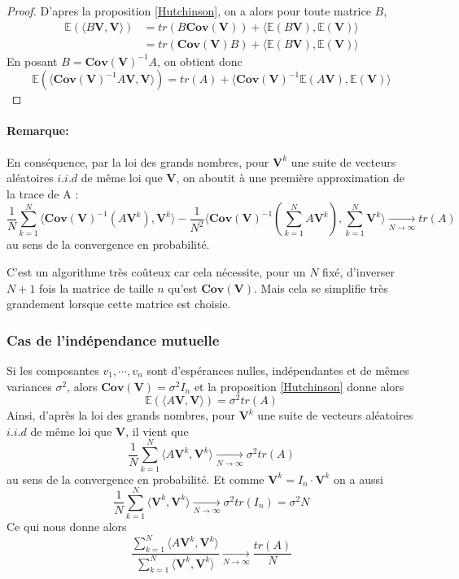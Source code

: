 \documentclass[12pt,a4paper]{article}
\numberwithin{equation}{section}
\begin{document}
\begin{proof}
    D'apres la proposition \ref{Hutchinson}, on a alors pour toute matrice $B$, 
    \begin{align*}
        \mathbb{E}(\langle B\textbf{V},\textbf{V}\rangle)&=tr(B\textbf{Cov}(\textbf{V})) + \langle \mathbb{E}(B\textbf{V}), \mathbb{E}(\textbf{V})\rangle\\
        &=tr(\textbf{Cov}(\textbf{V})B) + \langle \mathbb{E}(B\textbf{V}), \mathbb{E}(\textbf{V})\rangle
    \end{align*}
    En posant $B = \textbf{Cov}(\textbf{V})^{-1}A$, on obtient donc
    $$\mathbb{E}(\langle \textbf{Cov}(\textbf{V})^{-1}A\textbf{V},\textbf{V}\rangle)=tr(A) + \langle \textbf{Cov}(\textbf{V})^{-1}\mathbb{E}(A\textbf{V}), \mathbb{E}(\textbf{V})\rangle$$
\end{proof}
\paragraph{Remarque: }En conséquence, par la loi des grands nombres, pour $\textbf{V}^k$ une suite de vecteurs aléatoires $i.i.d$ de même loi que $\textbf{V}$, on aboutit à une première approximation de la trace de A :
$$\frac{1}{N}\sum_{k=1}^N\langle \textbf{Cov}(\textbf{V})^{-1}(A\textbf{V}^k),\textbf{V}^k\rangle - \frac{1}{N^2}\langle \textbf{Cov}(\textbf{V})^{-1} \left(\sum_{k=1}^NA\textbf{V}^k\right),\sum_{k=1}^N\textbf{V}^k\rangle\underset{N\rightarrow\infty}{\rightarrow}  tr(A)$$
au sens de la convergence en probabilité.


C'est un algorithme très coûteux car cela nécessite, pour un $N$ fixé, d'inverser $N+1$ fois la matrice de taille $n$ qu'est $\textbf{Cov}(\textbf{V})$. Mais cela se simplifie très grandement lorsque cette matrice est choisie.
\subsubsection{Cas de l'indépendance mutuelle}
Si les composantes $v_1, \cdots, v_n$ sont d'espérances nulles, indépendantes et de mêmes variances $\sigma^2$, alors $\textbf{Cov}(\textbf{V}) = \sigma^2I_n$ et la proposition \ref{Hutchinson} donne alors
    $$\mathbb{E}\left(\langle A\textbf{V},\textbf{V}\rangle \right) = \sigma^2tr(A)$$
Ainsi, d'après la loi des grands nombres, pour $\textbf{V}^k$ une suite de vecteurs aléatoires $i.i.d$ de même loi que $\textbf{V}$, il vient que
$$\frac{1}{N}\sum_{k=1}^N\langle A\textbf{V}^k,\textbf{V}^k\rangle  \underset{N\rightarrow\infty}{\rightarrow} \sigma ^2 tr(A)$$
au sens de la convergence en probabilité. Et comme $\textbf{V}^k = I_n\cdot \textbf{V}^k$ on a aussi
$$\frac{1}{N}\sum_{k=1}^N\langle \textbf{V}^k,\textbf{V}^k\rangle  \underset{N\rightarrow\infty}{\rightarrow} \sigma ^2 tr(I_n) = \sigma^2 N$$
Ce qui nous donne alors
$$\frac{\sum_{k=1}^N\langle A\textbf{V}^k,\textbf{V}^k\rangle }{\sum_{k=1}^N\langle \textbf{V}^k,\textbf{V}^k\rangle }\underset{N\rightarrow\infty}{\rightarrow} \frac{tr(A)}{N}$$
\newpage
\nocite{MT}
\nocite{Lannes}
\printbibliography
\end{document}
